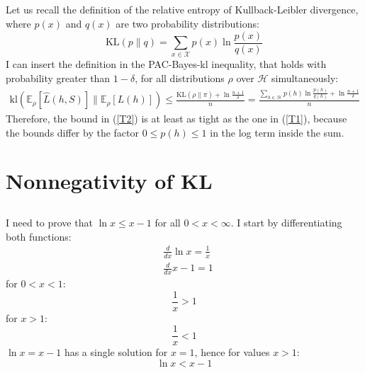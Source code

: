 \documentclass[a4paper]{article}
\begin{document}
\subsection{}
\label{subsec:32}
Let us recall the definition of the relative entropy of Kullback-Leibler
divergence, where $p(x)$ and $q(x)$ are two probability distributions:
\[
\mathrm{KL}(p \| q)=
\sum_{x \in \mathcal{X}} p(x) \ln \frac{p(x)}{q(x)}
\]
I can insert the definition in the PAC-Bayes-kl inequality, that holds with probability greater
than $1-\delta$, for all distributions $\rho$ over $\mathcal{H}$ simultaneously:
\begin{align}
  \label{T2}
\mathrm{kl}\left(\mathbb{E}_{\rho}[\hat{L}(h, S)] \|
\mathbb{E}_{\rho}[L(h)]\right)
\leq \frac{\mathrm{KL}(\rho \| \pi)+\ln \frac{n+1}{\delta}}{n}
=\frac{\sum_{h \in \mathcal{H}} p(h) \ln \frac{p(h)}{q(h)}+\ln \frac{n+1}{\delta}}{n}
\end{align}
Therefore, the bound in (\ref{T2}) is at least as tight as the one in (\ref{T1}),
because the bounds differ by the factor $0 \leq p(h) \leq 1$ in the log
term inside the sum.
\newpage

\section{Nonnegativity of KL}
\label{sec:4}
\subsection{}
\label{subsec:41}
I need to prove that $\ln x \leq x-1$ for all $0<x<\infty$. I start by
differentiating both functions:
\begin{align*}
&\frac{d}{dx}\ln x = \frac{1}{x} \\
&\frac{d}{dx}x-1 = 1 
\end{align*}
for $0 < x < 1:$
\[
\frac{1}{x} > 1
\]
for $x > 1:$
\[
\frac{1}{x} < 1 
\]
$\ln x = x-1$ has a single solution for $x=1$, hence for values $x>1$:
$$\ln x < x - 1$$
\end{document}
